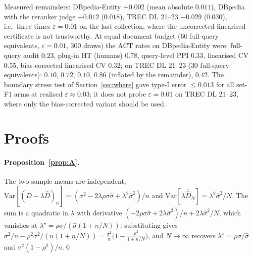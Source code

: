 \documentclass{article}
\newcommand{\eps}{\varepsilon}
\newcommand{\ACT}{\mathrm{ACT}}
\begin{document}
Measured remainders: DBpedia-Entity $+0.002$ (mean absolute $0.011$), DBpedia with the reranker judge $-0.012$ ($0.018$), TREC DL 21--23 $-0.029$ ($0.030$), i.e.\ three times $\eps=0.01$ on the last collection, where the uncorrected linearised certificate is not trustworthy. At equal document budget (60 full-query equivalents, $\eps=0.01$, 300 draws) the $\ACT$ rates on DBpedia-Entity were: full-query audit $0.23$, plug-in HT (humans) $0.78$, query-level PPI $0.33$, linearised CV $0.55$, bias-corrected linearised CV $0.32$; on TREC DL 21--23 (30 full-query equivalents): $0.10$, $0.72$, $0.10$, $0.86$ (inflated by the remainder), $0.42$. The boundary stress test of Section~\ref{sec:where} gave type-I error $\le0.013$ for all set-F1 arms at realised $\eps\approx0.03$; it does not probe $\eps=0.01$ on TREC DL 21--23, where only the bias-corrected variant should be used.

\section{Proofs}\label{app:proofs}
\paragraph{Proposition~\ref{prop:A}.} The two sample means are independent; $\mathrm{Var}[\overline{(D-\lambda\hat D)}_n]=(\sigma^2-2\lambda\rho\sigma\hat\sigma+\lambda^2\hat\sigma^2)/n$ and $\mathrm{Var}[\lambda\overline{\hat D}_N]=\lambda^2\hat\sigma^2/N$. The sum is a quadratic in $\lambda$ with derivative $(-2\rho\sigma\hat\sigma+2\lambda\hat\sigma^2)/n+2\lambda\hat\sigma^2/N$, which vanishes at $\lambda^\star=\rho\sigma/(\hat\sigma(1+n/N))$; substituting gives $\sigma^2/n-\rho^2\sigma^2/(n(1+n/N))=\frac{\sigma^2}{n}\big(1-\frac{\rho^2}{1+n/N}\big)$, and $N\to\infty$ recovers $\lambda^\star=\rho\sigma/\hat\sigma$ and $\sigma^2(1-\rho^2)/n$.\qed
\end{document}
